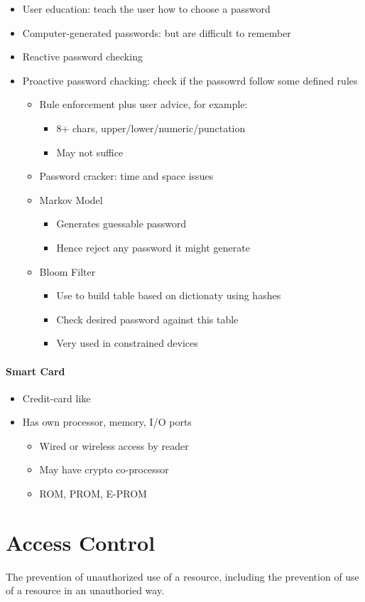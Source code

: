 \begin{itemize}
  \item User education: teach the user how to choose a password
  \item Computer-generated passwords: but are difficult to remember
  \item Reactive password checking
  \item Proactive password chacking: check if the passowrd follow some defined
rules
  \begin{itemize}
    \item Rule enforcement plus user advice, for example:
    \begin{itemize}
      \item 8+ chars, upper/lower/numeric/punctation
      \item May not suffice
    \end{itemize}
    \item Password cracker: time and space issues
    \item Markov Model
    \begin{itemize}
      \item Generates guessable password
      \item Hence reject any password it might generate
    \end{itemize}
    \item Bloom Filter
    \begin{itemize}
      \item Use to build table based on dictionaty using hashes
      \item Check desired password against this table
      \item Very used in constrained devices
    \end{itemize}
  \end{itemize}
\end{itemize}

\paragraph*{Smart Card}
\begin{itemize}
  \item Credit-card like
  \item Has own processor, memory, I/O ports
  \begin{itemize}
    \item Wired or wireless access by reader
    \item May have crypto co-processor
    \item ROM, PROM, E-PROM
  \end{itemize}
\end{itemize}

\section{Access Control}

The prevention of unauthorized use of a resource, including the prevention of
use of a resource in an unauthoried way.
